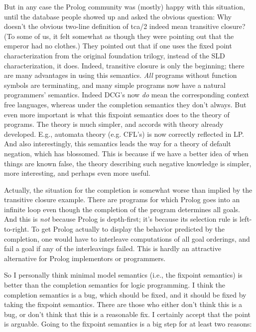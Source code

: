 But in any case the Prolog community was (mostly) happy with this
situation, until the database people showed up and asked the obvious
question: Why doesn't the obvious two-line definition of tca/2 indeed
mean transitive closure?  (To some of us, it felt somewhat as though
they were pointing out that the emperor had no clothes.)  They pointed
out that if one uses the fixed point characterization from the
original foundation trilogy, instead of the SLD characterization, it
does.  Indeed, transitive closure is only the beginning; there are
many advantages in using this semantics.  {\em All} programs without
function symbols are terminating, and many simple programs now have a
natural programmers' semantics.  Indeed DCG's now {\em do} mean the
corresponding context free languages, whereas under the completion
semantics they don't always.  But even more important is what this
fixpoint semantics does to the theory of programs.  The theory is much
simpler, and accords with theory already developed.  E.g., automata
theory (e.g. CFL's) is now correctly reflected in LP.  And also
interestingly, this semantics leads the way for a theory of default
negation, which has blossomed.  This is because if we have a better
idea of when things are known false, the theory describing such
negative knowledge is simpler, more interesting, and perhaps even more
useful.

Actually, the situation for the completion is somewhat worse than
implied by the transitive closure example.  There are programs for
which Prolog goes into an infinite loop even though the completion of
the program determines all goals.  And this is {\em not} because
Prolog is depth-first; it's because its selection rule is
left-to-right.  To get Prolog actually to display the behavior
predicted by the completion, one would have to interleave computations
of all goal orderings, and fail a goal if any of the interleavings
failed.  This is hardly an attractive alternative for Prolog
implementors or programmers.

So I personally think minimal model semantics (i.e., the fixpoint
semantics) is better than the completion semantics for logic
programming.  I think the completion semantics is a bug, which should
be fixed, and it should be fixed by taking the fixpoint semantics.
There are those who either don't think this is a bug, or don't think
that this is a reasonable fix.  I certainly accept that the point is
arguable.  Going to the fixpoint semantics is a big step for at least
two reasons: 

